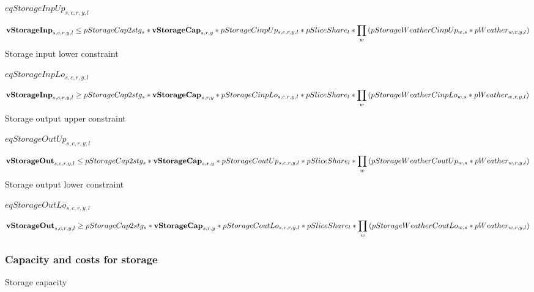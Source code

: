 \documentclass{article}
\begin{document}
$eqStorageInpUp_{s,c,r,y,l}$





\begin{dmath} 
{\bf vStorageInp}_{s,c,r,y,l}  \le  pStorageCap2stg_{s}*{\bf vStorageCap}_{s,r,y}*pStorageCinpUp_{s,c,r,y,l}*pSliceShare_{l}*\prod_{w}{\left(pStorageWeatherCinpUp_{w,s}*pWeather_{w,r,y,l}\right)}
\end{dmath} 
Storage input lower constraint







$eqStorageInpLo_{s,c,r,y,l}$





\begin{dmath} 
{\bf vStorageInp}_{s,c,r,y,l}  \ge  pStorageCap2stg_{s}*{\bf vStorageCap}_{s,r,y}*pStorageCinpLo_{s,c,r,y,l}*pSliceShare_{l}*\prod_{w}{\left(pStorageWeatherCinpLo_{w,s}*pWeather_{w,r,y,l}\right)}
\end{dmath} 
Storage output upper constraint







$eqStorageOutUp_{s,c,r,y,l}$





\begin{dmath} 
{\bf vStorageOut}_{s,c,r,y,l}  \le  pStorageCap2stg_{s}*{\bf vStorageCap}_{s,r,y}*pStorageCoutUp_{s,c,r,y,l}*pSliceShare_{l}*\prod_{w}{\left(pStorageWeatherCoutUp_{w,s}*pWeather_{w,r,y,l}\right)}
\end{dmath} 
Storage output lower constraint







$eqStorageOutLo_{s,c,r,y,l}$





\begin{dmath} 
{\bf vStorageOut}_{s,c,r,y,l}  \ge  pStorageCap2stg_{s}*{\bf vStorageCap}_{s,r,y}*pStorageCoutLo_{s,c,r,y,l}*pSliceShare_{l}*\prod_{w}{\left(pStorageWeatherCoutLo_{w,s}*pWeather_{w,r,y,l}\right)}
\end{dmath} 
\subsubsection*{Capacity and costs for storage}
Storage capacity
\end{document}
